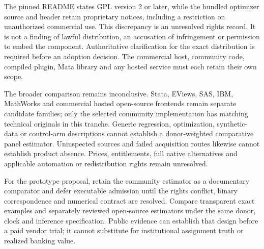The pinned README states GPL version 2 or later, while the bundled optimizer
source and header retain proprietary notices, including a restriction on
unauthorized commercial use. This discrepancy is an unresolved rights record.
It is not a finding of lawful distribution, an accusation of infringement or
permission to embed the component. Authoritative clarification for the exact
distribution is required before an adoption decision. The commercial host,
community code, compiled plugin, Mata library and any hosted service must each
retain their own scope.~\citep{exec19_synth_stata_source}

The broader comparison remains inconclusive. Stata, EViews, SAS, IBM,
MathWorks and commercial hosted open-source frontends remain separate candidate
families; only the selected community implementation has matching technical
originals in this tranche. Generic regression, optimization, synthetic-data or
control-arm descriptions cannot establish a donor-weighted comparative panel
estimator. Uninspected sources and failed acquisition routes likewise cannot
establish product absence. Prices, entitlements, full native alternatives and
applicable automation or redistribution rights remain unresolved.

For the prototype proposal, retain the community estimator as a documentary
comparator and defer executable admission until the rights conflict, binary
correspondence and numerical contract are resolved. Compare transparent exact
examples and separately reviewed open-source estimators under the same donor,
clock and inference specification. Public evidence can establish that design
before a paid vendor trial; it cannot substitute for institutional assignment
truth or realized banking value.
